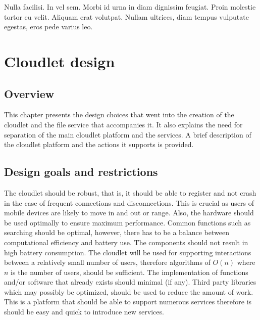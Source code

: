 \begin{savequote}[75mm] 
Nulla facilisi. In vel sem. Morbi id urna in diam dignissim feugiat. Proin molestie tortor eu velit. Aliquam erat volutpat. Nullam ultrices, diam tempus vulputate egestas, eros pede varius leo.
\end{savequote}

\chapter{Cloudlet design}
\label{chapterthree}

\section{Overview}

This chapter presents the design choices that went into the creation of the cloudlet and the file service that accompanies it. It also explains the need for separation of the main cloudlet platform
and the services. A brief description of the cloudlet platform and the actions it supports is provided.

\section{Design goals and restrictions}
The cloudlet should be robust, that is, it should be able to register and not crash in the case of frequent connections and disconnections. This is crucial as users of mobile devices are likely to move in and out or
range. Also, the hardware should be used optimally to ensure maximum performance. Common functions such as searching should be optimal, however, there has to be a balance between computational efficiency and battery
use. The components should not result in high battery consumption. The cloudlet will be used for supporting interactions between a relatively small number of users, therefore algorithms of $O(n)$ where $n$ is the number
of users, should be sufficient. The implementation of functions and/or software that already exists should minimal (if any). Third party libraries which may possibly be optimized, should be used to reduce the amount
of work. This is a platform that should be able to support numerous services therefore is should be easy and quick to introduce new services.\newline

